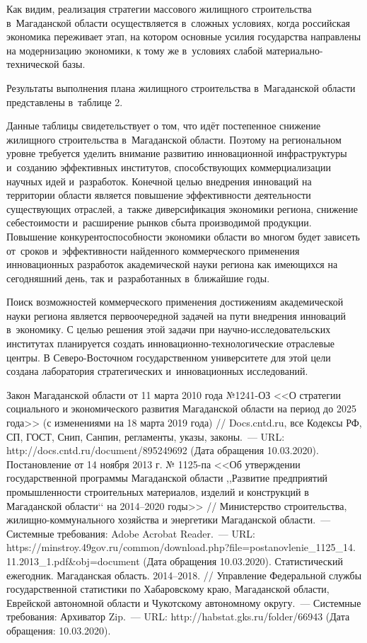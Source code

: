 Как видим, реализация стратегии массового жилищного строительства в~Магаданской области осуществляется в~сложных условиях, когда российская экономика переживает этап, на котором основные усилия государства направлены на модернизацию экономики, к тому же в~условиях слабой материально-технической базы.

Результаты выполнения плана жилищного строительства в~Магаданской области представлены в~таблице 2.



Данные таблицы свидетельствует о том, что идёт постепенное снижение жилищного строительства в~Магаданской области. Поэтому на региональном уровне требуется уделить внимание развитию инновационной инфраструктуры и~созданию эффективных институтов, способствующих коммерциализации научных идей и~разработок. Конечной целью внедрения инноваций на территории области является повышение эффективности деятельности существующих отраслей, а~также диверсификация экономики региона, снижение себестоимости и~расширение рынков сбыта производимой продукции.
\clearpage
Повышение конкурентоспособности экономики области во многом будет зависеть от~сроков и~эффективности найденного коммерческого применения инновационных разработок академической науки региона как имеющихся на сегодняшний день, так и~разработанных в~ближайшие годы.

Поиск возможностей коммерческого применения достижениям академической науки региона является первоочередной задачей на пути внедрения инноваций в~экономику. С целью решения этой задачи при научно-исследовательских институтах планируется создать ин\-но\-ва\-цион\-но-тех\-но\-ло\-ги\-чес\-кие отраслевые центры. В Северо-Восточном государственном университете для этой цели создана лаборатория стратегических и~инновационных исследований.

\begin{thebibliography}{99}
\bibitem{}Закон Магаданской области от 11 марта 2010 года №1241-ОЗ <<О стратегии социального и экономического развития Магаданской области на период до 2025 года>> (с изменениями на 18 марта 2019 года) // Docs.cntd.ru, все Кодексы РФ, СП, ГОСТ, Снип, Санпин, регламенты, указы, законы.~--- URL: http://docs.cntd.ru/document/895249692 (Дата обращения 10.03.2020).
\bibitem{}Постановление от 14 ноября 2013 г. № 1125-па <<Об утверждении государственной программы Магаданской области ,,Развитие предприятий промышленности строительных материалов, изделий и конструкций в Магаданской области‘‘ на 2014--2020 годы>> // Министерство строительства, жилищно-коммунального хозяйства и энергетики Магаданской области.~--- Системные требования: Adobe Acrobat Reader.~--- URL:
https://minstroy.49gov.ru/common/download.php?file=postanovlenie\_1125\_14.\\11.2013\_1.pdf\&obj=document (Дата обращения 10.03.2020).
\bibitem{}Статистический ежегодник. Магаданская область. 2014--2018. // Управление Федеральной службы государственной статистики по Хабаровскому краю, Магаданской области, Еврейской автономной области и Чукотскому автономному округу.~--- Системные требования: Архиватор Zip.~--- URL: http://habstat.gks.ru/folder/66943 (Дата обращения: 10.03.2020).

\end{thebibliography}

